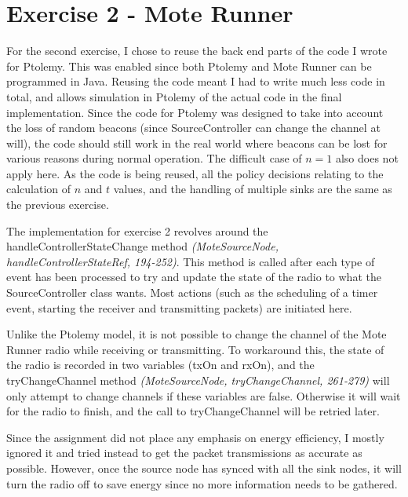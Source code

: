 \documentclass[a4paper,12pt,draft,DIV=calc]{scrartcl}
\newcommand{\coderef}[3]{\emph{(#1, #2, #3)}}
\begin{document}
\section{Exercise 2 - Mote Runner}
For the second exercise, I chose to reuse the back end parts of the code I wrote
for Ptolemy. This was enabled since both Ptolemy and Mote Runner can be
programmed in Java. Reusing the code meant I had to write much less code in
total, and allows simulation in Ptolemy of the actual code in the final
implementation. Since the code for Ptolemy was designed to take into account the
loss of random beacons (since SourceController can change the channel at will),
the code should still work in the real world where beacons can be lost for
various reasons during normal operation. The difficult case of $n = 1$ also does
not apply here. As the code is being reused, all the policy decisions relating
to the calculation of $n$ and $t$ values, and the handling of multiple sinks are
the same as the previous exercise.

The implementation for exercise 2 revolves around the
handleControllerStateChange method
\coderef{MoteSourceNode}{handleControllerStateRef}{194-252}. This method is
called after each type of event has been processed to try and update the state
of the radio to what the SourceController class wants. Most actions (such as the
scheduling of a timer event, starting the receiver and transmitting packets) are
initiated here.

Unlike the Ptolemy model, it is not possible to change the channel of the Mote
Runner radio while receiving or transmitting. To workaround this, the state of
the radio is recorded in two variables (txOn and rxOn), and the tryChangeChannel
method \coderef{MoteSourceNode}{tryChangeChannel}{261-279} will only attempt to
change channels if these variables are false. Otherwise it will wait for the
radio to finish, and the call to tryChangeChannel will be retried later.

Since the assignment did not place any emphasis on energy efficiency, I mostly
ignored it and tried instead to get the packet transmissions as accurate as
possible. However, once the source node has synced with all the sink nodes, it
will turn the radio off to save energy since no more information needs to be
gathered.
\end{document}
